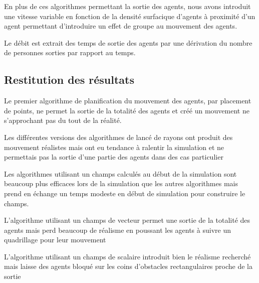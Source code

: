 \documentclass{article}
\begin{document}

En plus de ces algorithmes permettant la sortie des agents, nous avons introduit
une vitesse variable en fonction de la densité surfacique d'agents à proximité
d'un agent permettant d'introduire un effet de groupe au mouvement des agents.

Le débit est extrait des temps de sortie des agents par une dérivation du nombre
de personnes sorties par rapport au temps.

\subsection{Restitution des résultats}

Le premier algorithme de planification du mouvement des agents, par placement
de points, ne permet la sortie de la totalité des agents et créé un mouvement
ne s'approchant pas du tout de la réalité.


Les différentes versions des algorithmes de lancé de rayons ont produit des
mouvement réalistes mais ont eu tendance à ralentir la simulation et ne permettais
pas la sortie d'une partie des agents dans des cas particulier


Les algorithmes utilisant un champs calculés au début de la simulation sont beaucoup
plus efficaces lors de la simulation que les autres algorithmes mais prend en échange
un temps modeste en début de simulation pour construire le champs.


L'algorithme utilisant un champs de vecteur permet une sortie de la totalité des
agents mais perd beaucoup de réalisme en poussant les agents à suivre un
quadrillage pour leur mouvement


L'algorithme utilisant un champs de scalaire introduit bien le réalisme recherché
mais laisse des agents bloqué sur les coins d'obstacles rectangulaires proche
de la sortie

\end{document}
